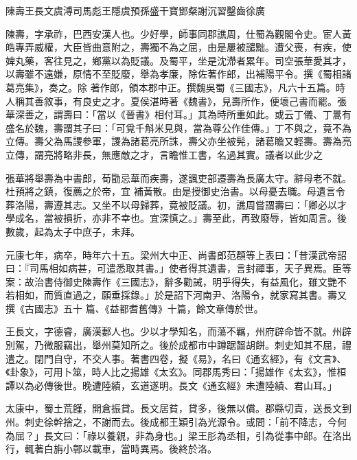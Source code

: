 
\begin{pinyinscope}

 陳壽王長文虞溥司馬彪王隱虞預孫盛干寶鄧粲謝沉習鑿齒徐廣



 陳壽，字承祚，巴西安漢人也。少好學，師事同郡譙周，仕蜀為觀閣令史。宦人黃皓專弄威權，大臣皆曲意附之，壽獨不為之屈，由是屢被譴黜。遭父喪，有疾，使婢丸藥，客往見之，鄉黨以為貶議。及蜀平，坐是沈滯者累年。司空張華愛其才，以壽雖不遠嫌，原情不至貶廢，舉為孝廉，除佐著作郎，出補陽平令。撰《蜀相諸葛亮集》，奏之。除
 著作郎，領本郡中正。撰魏吳蜀《三國志》，凡六十五篇。時人稱其善敘事，有良史之才。夏侯湛時著《魏書》，見壽所作，便壞己書而罷。張華深善之，謂壽曰：「當以《晉書》相付耳。」其為時所重如此。或云丁儀、丁暠有盛名於魏，壽謂其子曰：「可覓千斛米見與，當為尊公作佳傳。」丁不與之，竟不為立傳。壽父為馬謖參軍，謖為諸葛亮所誅，壽父亦坐被髡，諸葛瞻又輕壽。壽為亮立傳，謂亮將略非長，無應敵之才，言瞻惟工書，名過其實。議者以此少之



 張華將舉壽為中書郎，荀勖忌華而疾壽，遂諷吏部遷壽為長廣太守。辭母老不就。杜預將之鎮，復薦之於帝，宜
 補黃散。由是授御史治書。以母憂去職。母遺言令葬洛陽，壽遵其志。又坐不以母歸葬，竟被貶議。初，譙周嘗謂壽曰：「卿必以才學成名，當被損折，亦非不幸也。宜深慎之。」壽至此，再致廢辱，皆如周言。後數歲，起為太子中庶子，未拜。



 元康七年，病卒，時年六十五。梁州大中正、尚書郎范頵等上表曰：「昔漢武帝詔曰：『司馬相如病甚，可遣悉取其書。」使者得其遺書，言封禪事，天子異焉。臣等案：故治書侍御史陳壽作《三國志》，辭多勸誡，明乎得失，有益風化，雖文艷不若相如，而質直過之，願垂採錄。」於是詔下河南尹、洛陽令，就家寫其書。壽又撰《古國志》五十
 篇、《益都耆舊傳》十篇，餘文章傳於世。



 王長文，字德睿，廣漢郪人也。少以才學知名，而蕩不羈，州府辟命皆不就。州辟別駕，乃微服竊出，舉州莫知所之。後於成都市中蹲踞齧胡餅。刺史知其不屈，禮遣之。閉門自守，不交人事。著書四卷，擬《易》，名曰《通玄經》，有《文言》、《卦象》，可用卜筮，時人比之揚雄《太玄》。同郡馬秀曰：「揚雄作《太玄》，惟桓譚以為必傳後世。晚遭陸績，玄道遂明。長文《通玄經》未遭陸績、君山耳。」



 太康中，蜀土荒饉，開倉振貸。長文居貧，貸多，後無以償。郡縣切責，送長文到
 州。刺史徐幹捨之，不謝而去。後成都王穎引為光源令。或問：「前不降志，今何為屈？」長文曰：「祿以養親，非為身也。」梁王肜為丞相，引為從事中郎。在洛出行，輒著白旃小鄣以載車，當時異焉。後終於洛。




\end{pinyinscope}
